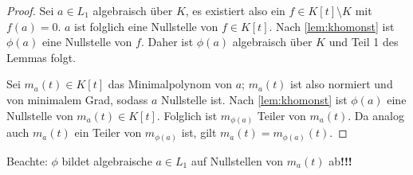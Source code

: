 \documentclass[12pt,a4paper]{scrartcl}
\begin{document}
\begin{proof}
	Sei $a\in L_1$ algebraisch über $K$, es existiert also ein $f\in K[t]\setminus K$ mit $f(a) = 0$. $a$ ist folglich eine Nullstelle von $f \in K[t]$. Nach \cref{lem:khomonst} ist $\phi(a)$ eine Nullstelle von $f$. Daher ist $\phi(a)$ algebraisch über $K$ und Teil 1 des Lemmas folgt.
	
	Sei $m_a(t) \in K[t]$ das Minimalpolynom von $a$; $m_a(t)$ ist also normiert und von minimalem Grad, sodass $a$ Nullstelle ist. Nach \cref{lem:khomonst} ist $\phi(a)$ eine Nullstelle von $m_a(t)\in K[t]$. Folglich ist $m_{\phi(a)}$ Teiler von $m_a(t)$. Da analog auch $m_a(t)$ ein Teiler von $m_{\phi(a)}$ ist, gilt $m_a(t) = m_{\phi(a)} (t)$.
\end{proof}

\begin{bem}
	Beachte: $\phi$ bildet algebraische $a\in L_1$ auf Nullstellen von $m_a(t)$ ab\textbf{!!!}
\end{bem}
\end{document}
